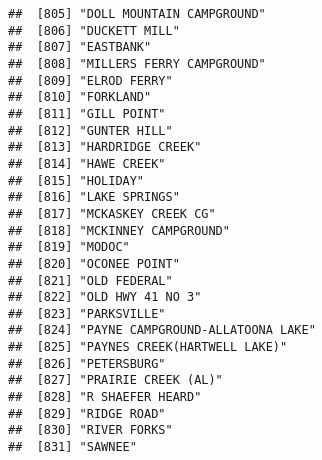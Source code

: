 \documentclass[
]{article}
\begin{document}
\begin{verbatim}
##  [805] "DOLL MOUNTAIN CAMPGROUND"                                                            
##  [806] "DUCKETT MILL"                                                                        
##  [807] "EASTBANK"                                                                            
##  [808] "MILLERS FERRY CAMPGROUND"                                                            
##  [809] "ELROD FERRY"                                                                         
##  [810] "FORKLAND"                                                                            
##  [811] "GILL POINT"                                                                          
##  [812] "GUNTER HILL"                                                                         
##  [813] "HARDRIDGE CREEK"                                                                     
##  [814] "HAWE CREEK"                                                                          
##  [815] "HOLIDAY"                                                                             
##  [816] "LAKE SPRINGS"                                                                        
##  [817] "MCKASKEY CREEK CG"                                                                   
##  [818] "MCKINNEY CAMPGROUND"                                                                 
##  [819] "MODOC"                                                                               
##  [820] "OCONEE POINT"                                                                        
##  [821] "OLD FEDERAL"                                                                         
##  [822] "OLD HWY 41 NO 3"                                                                     
##  [823] "PARKSVILLE"                                                                          
##  [824] "PAYNE CAMPGROUND-ALLATOONA LAKE"                                                     
##  [825] "PAYNES CREEK(HARTWELL LAKE)"                                                         
##  [826] "PETERSBURG"                                                                          
##  [827] "PRAIRIE CREEK (AL)"                                                                  
##  [828] "R SHAEFER HEARD"                                                                     
##  [829] "RIDGE ROAD"                                                                          
##  [830] "RIVER FORKS"                                                                         
##  [831] "SAWNEE"                                                                              

\end{verbatim}
\end{document}
